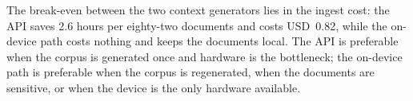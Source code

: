 The break-even between the two context generators lies in the ingest cost: the
API saves 2.6 hours per eighty-two documents and costs USD~0.82, while the
on-device path costs nothing and keeps the documents local. The API is
preferable when the corpus is generated once and hardware is the bottleneck;
the on-device path is preferable when the corpus is regenerated, when the
documents are sensitive, or when the device is the only hardware available.
